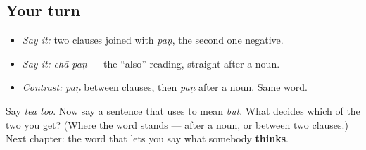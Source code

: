 \subsection*{Your turn}
\begin{itemize}
\raggedright
  \item \emph{Say it:} two clauses joined with \emph{paṇ}, the second one negative.
  \item \emph{Say it:} \emph{chā paṇ} — the \textquotedblleft{}also\textquotedblright{} reading, straight after a noun.
  \item \emph{Contrast:} \emph{paṇ} between clauses, then \emph{paṇ} after a noun. Same word.
\end{itemize}

\begin{tcolorbox}[breakable,colback=teal!4,colframe=teal!35!black,title={Before you move on}]
Say \emph{tea too}. Now say a sentence that uses \textbf{} to mean \emph{but}. What decides which of the two you get? (Where the word stands — after a noun, or between two clauses.) Next chapter: the word that lets you say what somebody \textbf{thinks}.
\end{tcolorbox}

